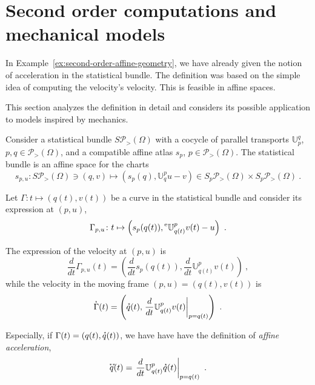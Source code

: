 \documentclass[axioms,article,submit,pdftex,moreauthors]{Definitions/mdpi}
\theoremstyle{plain}
\theoremstyle{remark}
\newcommand{\acceleration}[1]{\accentset{**}{#1}}
\newcommand{\derivby}[1]{\frac{d}{d#1}}
\newcommand{\etransport}[2]{\prescript{\text{e}}{} {\mathbb U} _ {#1} ^ {#2}}
\newcommand{\expbundleat}[1]{S\pdensitieson{#1}}
\newcommand{\expfibreat}[2]{S_{#1}\pdensitieson{#2}}
\newcommand{\pdensitieson}[1]{\mathcal P_{>}\left(#1\right)}
\newcommand{\transport}[2]{{\mathbb U} _ {#1} ^ {#2}}
\newcommand{\velocity}[1]{\accentset{\star}{#1}}
\begin{document}
\section{Second order computations and mechanical models}
\label{sec:mechanics}

In Example~\ref{ex:second-order-affine-geometry}, we have already given the notion of acceleration in the statistical bundle. The definition was based on the simple idea of computing the velocity's velocity. This is feasible in affine spaces.

This section analyzes the definition in detail and considers its possible application to models inspired by mechanics.

Consider a statistical bundle $\expbundleat \Omega$ with a cocycle of parallel transports $\transport p q$, $p,q \in \pdensitieson \Omega$, and a compatible affine atlas $s_p$, $p \in \pdensitieson \Omega$. The statistical bundle is an affine space for the charts
\begin{equation*}
    s_{p,u} \colon \expbundleat\Omega \ni (q,v) \mapsto \left(s_p(q),\transport q p u - v\right) \in \expfibreat{p}{\Omega} \times \expfibreat{p}{\Omega} \ .
\end{equation*}

Let $\Gamma \colon t \mapsto (q(t),v(t))$ be a curve in the statistical bundle and consider its expression at $(p,u)$,
\begin{equation*}
 \Gamma_{p,u} \colon t \mapsto  \left(s_p(q(t)), \etransport{q(t)}{p} v(t) - u\right) \ .  
\end{equation*}

The expression of the velocity at $(p,u)$ is 
\begin{equation*}
  \derivby t \Gamma_{p,u}(t) = \left(\derivby t s_p(q(t)), \derivby t \transport{q(t)}{p} v(t) \right)  \ ,
  \end{equation*}
while the velocity in the moving frame $(p,u) = (q(t),v(t))$ is
\begin{equation*}
 \velocity \Gamma(t) = \left(\velocity q(t), \left. \derivby t\transport{q(t)}{p} v(t) \right|_{p = q(t)} \right)\ .
\end{equation*}

Especially, if $\Gamma(t) = (q(t),\velocity q(t))$, we have have have the definition of \emph{affine acceleration},
\begin{equation}\label{eq:affine-acceleration}
\acceleration q(t) = \left. \derivby t\transport{q(t)}{p} \velocity q(t) \right|_{p = q(t)} \ . \end{equation}
\end{document}
